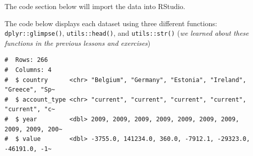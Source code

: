 \documentclass[letterpaper,12pt,twoside,]{pinp}
\begin{document}
The code section below will import the data into RStudio.

\begin{Shaded}
\begin{Highlighting}[]
\OtherTok{\textless{}{-}}\SpecialCharTok{::}\NormalTok{(}\NormalTok{)}
\OtherTok{\textless{}{-}}\SpecialCharTok{::}\NormalTok{(}\NormalTok{)}
\OtherTok{\textless{}{-}}\SpecialCharTok{::}\NormalTok{(}\NormalTok{)}
\OtherTok{\textless{}{-}}\SpecialCharTok{::}\NormalTok{(}\NormalTok{)}
\end{Highlighting}
\end{Shaded}

The code below displays each dataset using three different functions:
\texttt{dplyr::glimpse()}, \texttt{utils::head()}, and
\texttt{utils::str()} (\emph{we learned about these functions in the
previous lessons and exercises})

\begin{Shaded}
\begin{Highlighting}[]
\SpecialCharTok{\%\textgreater{}\%}\SpecialCharTok{::}\NormalTok{()}
\end{Highlighting}
\end{Shaded}

\begin{ShadedResult}
\begin{verbatim}
#  Rows: 266
#  Columns: 4
#  $ country      <chr> "Belgium", "Germany", "Estonia", "Ireland", "Greece", "Sp~
#  $ account_type <chr> "current", "current", "current", "current", "current", "c~
#  $ year         <dbl> 2009, 2009, 2009, 2009, 2009, 2009, 2009, 2009, 2009, 200~
#  $ value        <dbl> -3755.0, 141234.0, 360.0, -7912.1, -29323.0, -46191.0, -1~
\end{verbatim}
\end{ShadedResult}

\begin{Shaded}
\begin{Highlighting}[]
\SpecialCharTok{\%\textgreater{}\%}\SpecialCharTok{::}\NormalTok{()}
\end{Highlighting}
\end{Shaded}
\end{document}
